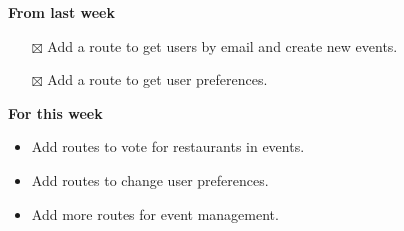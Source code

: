 \documentclass[12pt,letterpaper]{article}
\newcommand{\done}{$\boxtimes$}
\begin{document}
\textbf{From last week}
\begin{itemize}
  \item[\done] Add a route to get users by email and create new events.
  \item[\done] Add a route to get user preferences.
\end{itemize}


\textbf{For this week}
\begin{itemize}
  \item Add routes to vote for restaurants in events.
  \item Add routes to change user preferences.
  \item Add more routes for event management.
\end{itemize}
\end{document}
